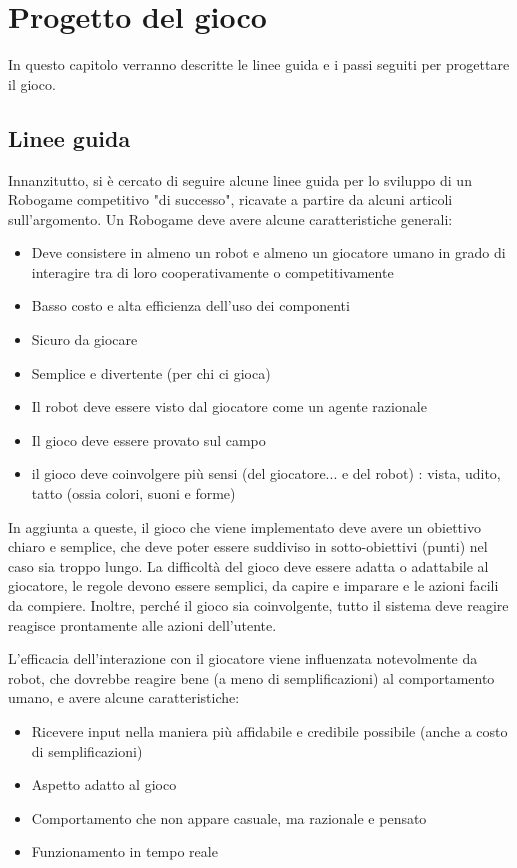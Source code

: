 \chapter{Progetto del gioco}
\label{cap:progetto}

In questo capitolo verranno descritte le linee guida e i passi seguiti per progettare il gioco.

\section{Linee guida}
Innanzitutto, si è cercato di seguire alcune linee guida per lo sviluppo di un Robogame competitivo "di successo", ricavate a partire da alcuni articoli sull'argomento. Un Robogame deve avere alcune caratteristiche generali:
\begin{itemize}
\item Deve consistere in almeno un robot e almeno un giocatore umano in grado di interagire tra di loro cooperativamente o competitivamente
\item Basso costo e alta efficienza dell’uso dei componenti
\item Sicuro da giocare
\item Semplice e divertente (per chi ci gioca)
\item Il robot deve essere visto dal giocatore come un agente razionale
\item Il gioco deve essere provato sul campo
\item il gioco deve coinvolgere più sensi (del giocatore... e del robot) : vista, udito, tatto (ossia colori, suoni e forme)
\end{itemize}
In aggiunta a queste, il gioco che viene implementato deve avere un obiettivo chiaro e semplice, che deve poter essere suddiviso in sotto-obiettivi (punti) nel caso sia troppo lungo. La difficoltà del gioco deve essere adatta o adattabile al giocatore, le regole devono essere semplici, da capire e imparare e le azioni facili da compiere. Inoltre, perché il gioco sia coinvolgente, tutto il sistema deve reagire reagisce prontamente alle azioni dell'utente.

L'efficacia dell'interazione con il giocatore viene influenzata notevolmente da robot, che dovrebbe reagire bene (a meno di semplificazioni) al comportamento umano, e avere alcune caratteristiche:
\begin{itemize}
\item Ricevere input nella maniera più affidabile e credibile possibile (anche a costo di semplificazioni)
\item Aspetto adatto al gioco
\item Comportamento che non appare casuale, ma razionale e pensato
\item Funzionamento in tempo reale
\end{itemize}

